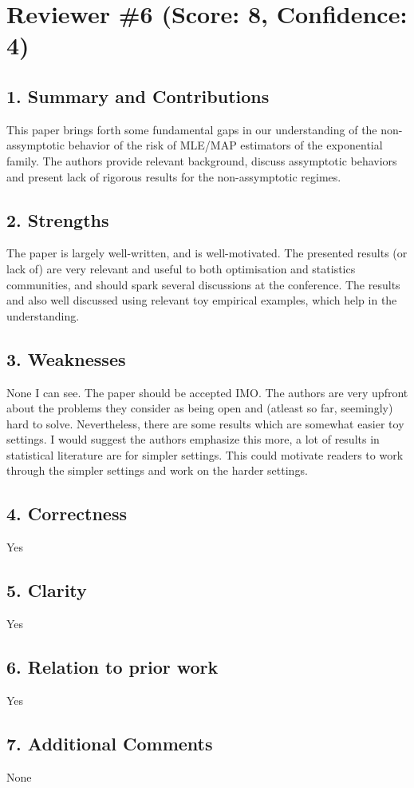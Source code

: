 \newpage
\section*{Reviewer \#6 (Score: 8, Confidence: 4)}

\subsection*{1. Summary and Contributions}

This paper brings forth some fundamental gaps in our understanding of the non-assymptotic behavior of the risk of MLE/MAP estimators of the exponential family. The authors provide relevant background, discuss assymptotic behaviors and present lack of rigorous results for the non-assymptotic regimes.

\subsection*{2. Strengths}

The paper is largely well-written, and is well-motivated. The presented results (or lack of) are very relevant and useful to both optimisation and statistics communities, and should spark several discussions at the conference. The results and also well discussed using relevant toy empirical examples, which help in the understanding.


\subsection*{3. Weaknesses}

None I can see. The paper should be accepted IMO. The authors are very upfront about the problems they consider as being open and (atleast so far, seemingly) hard to solve. Nevertheless, there are some results which are somewhat easier toy settings. I would suggest the authors emphasize this more, a lot of results in statistical literature are for simpler settings. This could motivate readers to work through the simpler settings and work on the harder settings.

\subsection*{4. Correctness}
Yes

\subsection*{5. Clarity}

Yes

\subsection*{6. Relation to prior work}

Yes

\subsection*{7. Additional Comments}

None
